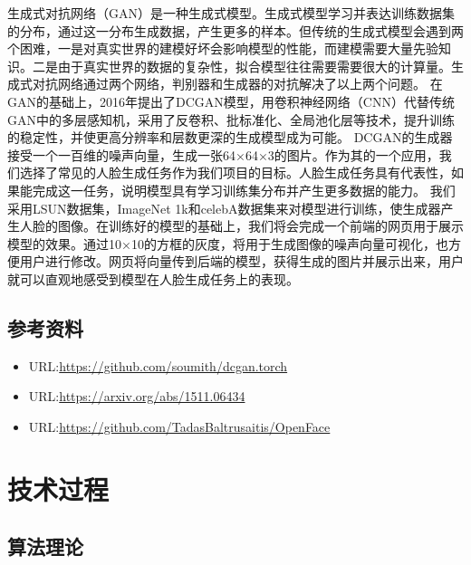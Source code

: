\documentclass[hyperref, a4paper]{ctexart}
\providecommand{\tightlist}{%
  \setlength{\itemsep}{0pt}\setlength{\parskip}{0pt}}
\begin{document}
生成式对抗网络（GAN）是一种生成式模型。生成式模型学习并表达训练数据集的分布，通过这一分布生成数据，产生更多的样本。但传统的生成式模型会遇到两个困难，一是对真实世界的建模好坏会影响模型的性能，而建模需要大量先验知识。二是由于真实世界的数据的复杂性，拟合模型往往需要需要很大的计算量。生成式对抗网络通过两个网络，判别器和生成器的对抗解决了以上两个问题。
在GAN的基础上，2016年提出了DCGAN模型，用卷积神经网络（CNN）代替传统GAN中的多层感知机，采用了反卷积、批标准化、全局池化层等技术，提升训练的稳定性，并使更高分辨率和层数更深的生成模型成为可能。
DCGAN的生成器接受一个一百维的噪声向量，生成一张64×64×3的图片。作为其的一个应用，我们选择了常见的人脸生成任务作为我们项目的目标。人脸生成任务具有代表性，如果能完成这一任务，说明模型具有学习训练集分布并产生更多数据的能力。
我们采用LSUN数据集，ImageNet
1k和celebA数据集来对模型进行训练，使生成器产生人脸的图像。在训练好的模型的基础上，我们将会完成一个前端的网页用于展示模型的效果。通过10×10的方框的灰度，将用于生成图像的噪声向量可视化，也方便用户进行修改。网页将向量传到后端的模型，获得生成的图片并展示出来，用户就可以直观地感受到模型在人脸生成任务上的表现。

\hypertarget{ux53c2ux8003ux8d44ux6599}{%
\subsection{参考资料}\label{ux53c2ux8003ux8d44ux6599}}

\begin{itemize}
\tightlist
\item
  URL:\url{https://github.com/soumith/dcgan.torch}
\item
  URL:\url{https://arxiv.org/abs/1511.06434}
\item
  URL:\url{https://github.com/TadasBaltrusaitis/OpenFace}
\end{itemize}

\hypertarget{ux6280ux672fux8fc7ux7a0b}{%
\section{技术过程}\label{ux6280ux672fux8fc7ux7a0b}}

\hypertarget{ux7b97ux6cd5ux7406ux8bba}{%
\subsection{算法理论}\label{ux7b97ux6cd5ux7406ux8bba}}
\end{document}
